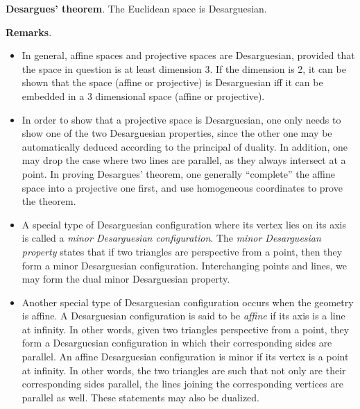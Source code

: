 \documentclass{article}
\begin{document}
\textbf{Desargues' theorem}.  The Euclidean space is Desarguesian.

\textbf{Remarks}.  
\begin{itemize}
\item In general, affine spaces and projective spaces are Desarguesian, provided that the space in question is at least dimension 3.  If the dimension is 2, it can be shown that the space (affine or projective) is Desarguesian iff it can be embedded in a 3 dimensional space (affine or projective).
\item In order to show that a projective space is Desarguesian, one only needs to show one of the two Desarguesian properties, since the other one may be automatically deduced according to the principal of duality.  In addition, one may drop the case where two lines are parallel, as they always intersect at a point.  In proving Desargues' theorem, one generally ``complete'' the affine space into a projective one first, and use homogeneous coordinates to prove the theorem.
\item A special type of Desarguesian configuration where its vertex lies on its axis is called a \emph{minor Desarguesian configuration}.  The \emph{minor Desarguesian property} states that if two triangles are perspective from a point, then they form a minor Desarguesian configuration.  Interchanging points and lines, we may form the dual minor Desarguesian property.
\item Another special type of Desarguesian configuration occurs when the geometry is affine.  A Desarguesian configuration is said to be \emph{affine} if its axis is a line at infinity.  In other words, given two triangles perspective from a point, they form a Desarguesian configuration in which their corresponding sides are parallel.  An affine Desarguesian configuration is minor if its vertex is a point at infinity.  In other words, the two triangles are such that not only are their corresponding sides parallel, the lines joining the corresponding vertices are parallel as well.  These statements may also be dualized.
\end{itemize}
\end{document}

